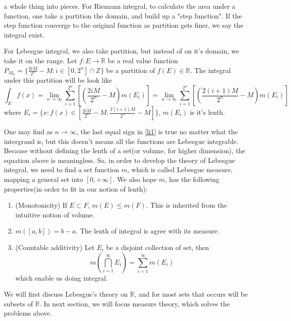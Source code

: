 \documentclass[lang=en, 12pt]{elegantbook}
\newcommand{\RR}{\mathbb{R}}
\begin{document}
    a whole thing into pieces. For Riemann integral, to calculate the area under a function, one take a partition the domain, and build up 
    a "step function". If the step function converge to the original function as partition gets finer, we say the integral exist.\par
        For Lebesgue integral, we also take partition, but instead of on it's domain, we take it on the range. Let $f:E\to \mathbb{R}$ be a real value function
    $P_{M_n} = \{\frac{2iM}{2^n} -M : i \in [0,2^n] \cap \mathbb{Z} \}$ be a partition of $f(E) \in \mathbb{R}$. The integral under this partition will be 
    look like 
    \begin{equation}
    \int_E{f(x)} = \lim_{n \to \infty} \sum_{i=1}^{2^n} [(\frac{2iM}{2^n} - M )m(E_i)] = \lim_{n \to \infty} \sum_{i=1}^{2^n} [(\frac{2(i+1)M}{2^n} - M )m(E_i)] \label{li1} 
    \end{equation}
    where $E_i=\{x:f(x) \in [\frac{2iM}{2^n} -M,\frac{2(i+1)M}{2^n}-M]\}$, $m(E_i)$ is it's lenth.\par
        One may find as $n \to \infty$, the last equal sign in \eqref{li1} is true no matter what the intergrand is, but this doesn't means all the functions
    are Lebesgue integrable. Because without defining the lenth of a set(or volume, for higher dimension), the equation above is meaningless.
    So, in order to develop the theory of Lebesgue integral, we need to find a set function $m$, which is called Lebesgue measure, mapping 
    a general set into $[0,+\infty]$. We also hope $m$, has the following properties(in order to fit in our notion of lenth):
        \begin{enumerate}
            \item (Monotonicity) If $E \subset F$, $m(E) \leq m(F)$. This is inherited from the intuitive notion of volume.
            \item $m([a,b]) = b - a$. The lenth of integral is agree with its measure.
            \item (Countable additivity) Let ${E_i}$ be a disjoint collection of set, then $$m(\bigcap_{i=1}^{\infty} E_i) = \sum_{i=1}^{\infty}m(E_i)$$
            which enable us doing integral.
        \end{enumerate} \par
        We will first discuss Lebesgue's theory on $\RR$, and for most sets that occurs will be subsets of $\RR$. In next section, we will focus 
    measure theory, which solves the problems above.
\end{document}
